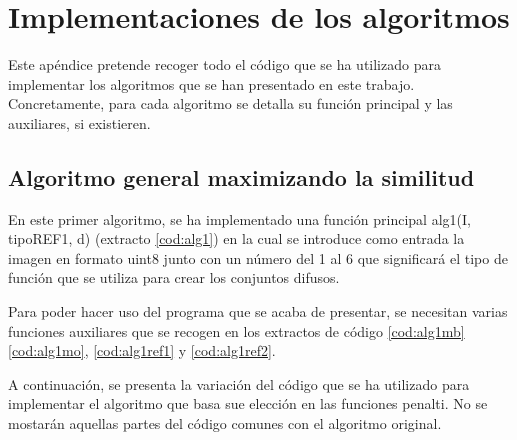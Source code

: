 \documentclass[main]{subfiles}
\begin{document}
\chapter{Implementaciones de los algoritmos}
Este apéndice pretende recoger todo el código que se ha utilizado para implementar los algoritmos que se han presentado en este trabajo. Concretamente, para cada algoritmo se detalla su función principal y las auxiliares, si existieren.


\section{Algoritmo general maximizando la similitud}
En este primer algoritmo, se ha implementado una función principal {\ttfamily alg1(I, tipoREF1, d)} (extracto \ref{cod:alg1}) en la cual se introduce como entrada la imagen en formato {\ttfamily uint8} junto con un número del 1 al 6 que significará el tipo de función que se utiliza para crear los conjuntos difusos.
\bgroup
{}
\egroup

\newpage

Para poder hacer uso del programa que se acaba de presentar, se necesitan varias funciones auxiliares que se recogen en los extractos de código \ref{cod:alg1mb} \ref{cod:alg1mo}, \ref{cod:alg1ref1} y \ref{cod:alg1ref2}.
\bgroup
{}
\egroup

\bgroup
{}
\egroup

\bgroup
{}
\egroup

\newpage
\bgroup
{}
\egroup

A continuación, se presenta la variación del código que se ha utilizado para implementar el algoritmo que basa sue elección en las funciones penalti. No se mostarán aquellas partes del código comunes con el algoritmo original.
\bgroup
{}
\egroup
\end{document}
